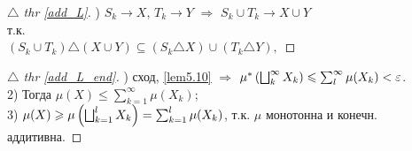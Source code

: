 
\begin{minipage}[t]{0.45\textwidth}
\begin{proof}[
{$\triangle$} 
thr \eqref{add_L}]

\phantom{42}

) $S_k \to X$, $T_k \to Y$ $\Rightarrow$ $S_k \cup T_k \to X \cup Y$ 
\\т.к.\\
$(S_k \cup T_k) \triangle (X \cup Y) \subseteq (S_k \triangle X) \cup (T_k \triangle Y),$
\end{proof}

\end{minipage}
\hfill
\begin{minipage}[t]{0.45\textwidth}
\begin{proof}[
\hypertarget{534_link}{$\triangle$} 
thr \eqref{add_L_end}]

\phantom{42}

) сход, \eqref{lem5.10} $\Rightarrow$
$\mu^*\left(\bigsqcup_{k}^{\infty} X_k\right) \leqslant \sum_l^{\infty} \mu(X_k) < \varepsilon$. \\
2) Тогда $\mu(X) \leq \sum_{k=1}^{\infty} \mu(X_k)$; \\
3) $\mu(X) \geqslant \mu\left(\bigsqcup_{k=1}^l X_k\right) = \sum_{k=1}^{l} \mu(X_k)$, т.к. $\mu$ монотонна и конечн. аддитивна.
\end{proof}
\end{minipage}  
